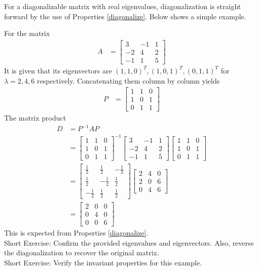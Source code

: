 For a diagonalizable matrix with real eigenvalues, diagonalization is straight forward by the use of Properties \ref{diagonalize}. Below shows a simple example.
\begin{exmp}
For the matrix 
\begin{align*}
A &= 
\begin{bmatrix}
3 & -1 & 1 \\
-2 & 4 & 2 \\
-1 & 1 & 5
\end{bmatrix}
\end{align*}
It is given that its eigenvectors are $(1,1,0)^T, (1,0,1)^T, (0,1,1)^T$ for $\lambda = 2,4,6$ respectively. Concatenating them column by column yields
\begin{align*}
P &=
\begin{bmatrix}
1 & 1 & 0 \\
1 & 0 & 1 \\
0 & 1 & 1
\end{bmatrix}
\end{align*}
The matrix product
\begin{align*}
D &= P^{-1}AP \\
&=
\begin{bmatrix}
1 & 1 & 0 \\
1 & 0 & 1 \\
0 & 1 & 1
\end{bmatrix}^{-1}
\begin{bmatrix}
3 & -1 & 1 \\
-2 & 4 & 2 \\
-1 & 1 & 5
\end{bmatrix}
\begin{bmatrix}
1 & 1 & 0 \\
1 & 0 & 1 \\
0 & 1 & 1
\end{bmatrix} \\
&=
\begin{bmatrix}
\frac{1}{2} & \frac{1}{2} & -\frac{1}{2} \\
\frac{1}{2} & -\frac{1}{2} & \frac{1}{2} \\
-\frac{1}{2} & \frac{1}{2} & \frac{1}{2}
\end{bmatrix}
\begin{bmatrix}
2 & 4 & 0 \\
2 & 0 & 6 \\
0 & 4 & 6
\end{bmatrix} \\
&=
\begin{bmatrix}
2 & 0 & 0 \\
0 & 4 & 0 \\
0 & 0 & 6
\end{bmatrix}
\end{align*}
This is expected from Properties \ref{diagonalize}.\\
Short Exercise: Confirm the provided eigenvalues and eigenvectors. Also, reverse the diagonalization to recover the original matrix.\\
Short Exercise: Verify the invariant properties for this example.
\end{exmp}

